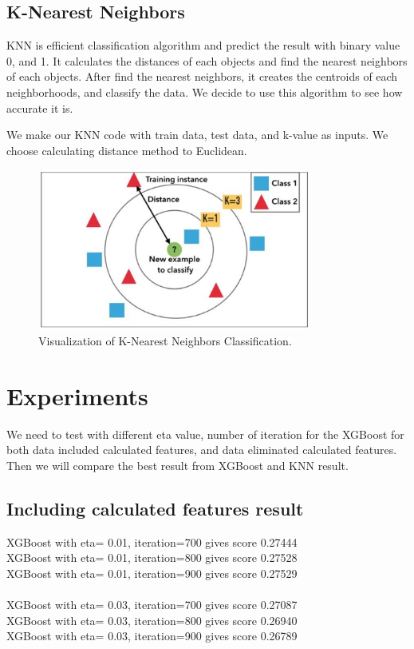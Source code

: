 \documentclass[fleqn,10pt]{SelfArx} %
\begin{document}
\subsection{K-Nearest Neighbors}
\hspace{\parindent} KNN is efficient classification algorithm and predict the result with binary value 0, and 1. It calculates the distances of each objects and find the nearest neighbors of each objects. After find the nearest neighbors, it creates the centroids of each neighborhoods, and classify the data. We decide to use this algorithm to see how accurate it is. 

We make our KNN code with train data, test data, and k-value as inputs. We choose calculating distance method to Euclidean.

\begin{figure}[h]
\includegraphics[width=9cm]{knn.png}
\caption{Visualization of K-Nearest Neighbors Classification. }
\end{figure}
\bigskip
\bigskip


\section{Experiments}
\hspace{\parindent} We need to test with different eta value, number of iteration for the XGBoost for both data included calculated features, and data eliminated calculated features. Then we will compare the best result from XGBoost and KNN result.


\subsection{Including calculated features result}
XGBoost with eta= 0.01, iteration=700 gives score 0.27444 \\
XGBoost with eta= 0.01, iteration=800 gives score 0.27528 \\
XGBoost with eta= 0.01, iteration=900 gives score 0.27529\\
\\ 
XGBoost with eta= 0.03, iteration=700 gives score 0.27087\\ 
XGBoost with eta= 0.03, iteration=800 gives score 0.26940\\ 
XGBoost with eta= 0.03, iteration=900 gives score 0.26789\\
\end{document}

